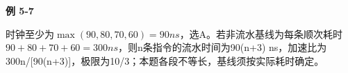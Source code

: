 {\color{ink}\bfseries 例 5-7}\par\vspace{1bp}时钟至少为\(\operatorname{max}(90,\allowbreak{}80,\allowbreak{}70,\allowbreak{}60)=\allowbreak{}90 ns\)，选A。若非流水基线为每条顺次耗时\(90+\allowbreak{}80+\allowbreak{}70+\allowbreak{}60=\allowbreak{}300 ns\)，则n条指令的流水时间为90(n+\allowbreak{}3) ns，加速比为300n/\allowbreak{}[90(n+\allowbreak{}3)]，极限为10/\allowbreak{}3；本题各段不等长，基线须按实际耗时确定。
